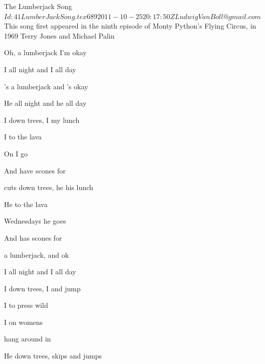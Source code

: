 \begin{SBSong}{The Lumberjack Song}
  {$Id: 41LumberJackSong.tex 689 2011-10-25 20:17:50Z LudwigVanBoll@gmail.com $}
  {This song first appeared in the ninth episode of Monty Python's Flying Circus, in 1969}
  {Terry Jones and Michael Palin}
  \begin{SBVerse}
    Oh,  a lumberjack  I'm okay
    
    I  all night and I  all day
  \end{SBVerse}
  \begin{SBVerse}
    's a lumberjack and 's okay
    
    He  all night and he  all day
  \end{SBVerse}
  \begin{SBVerse}
    I  down trees, I  my lunch
    
    I  to the lava
    
    On  I go 
    
    And have  scones  for  
  \end{SBVerse}
  \begin{SBVerse}
     cuts down trees, he  his lunch
    
    He  to the lava
    
     Wednesdays he goes 
    
    And has  scones  for  
  \end{SBVerse}
  \begin{SBVerse}
     a lumberjack, and  ok
    
    I  all night and I  all day
    
    I  down trees, I  and jump
    
    I  to press wild
    
    I  on womens 
    
     hang around in 
  \end{SBVerse}
  \CBPageBrk
  \begin{SBVerse}
    He  down trees,  skips and jumps
    

\end{SBVerse}
\end{SBSong}
